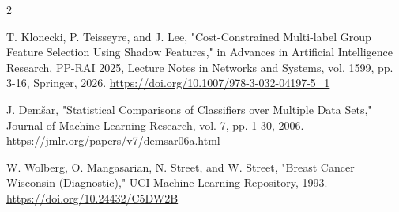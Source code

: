 \documentclass[10pt,a4paper]{article}
\begin{document}
\begin{multicols}{2}
\begin{minipage}{\linewidth}{\fontsize{7}{8.2}\selectfont [7] T. Klonecki, P. Teisseyre, and J. Lee, "Cost-Constrained Multi-label Group Feature Selection Using Shadow Features," in Advances in Artificial Intelligence Research, PP-RAI 2025, Lecture Notes in Networks and Systems, vol. 1599, pp. 3-16, Springer, 2026. \url{https://doi.org/10.1007/978-3-032-04197-5_1}\par}\end{minipage}\par
\begin{minipage}{\linewidth}{\fontsize{7}{8.2}\selectfont [8] J. Demšar, "Statistical Comparisons of Classifiers over Multiple Data Sets," Journal of Machine Learning Research, vol. 7, pp. 1-30, 2006. \url{https://jmlr.org/papers/v7/demsar06a.html}\par}\end{minipage}\par
\begin{minipage}{\linewidth}{\fontsize{7}{8.2}\selectfont [9] W. Wolberg, O. Mangasarian, N. Street, and W. Street, "Breast Cancer Wisconsin (Diagnostic)," UCI Machine Learning Repository, 1993. \url{https://doi.org/10.24432/C5DW2B}\par}\end{minipage}\par
\end{multicols}
\end{document}
